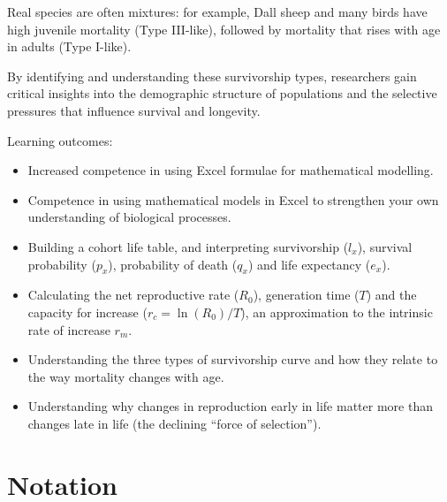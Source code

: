 \documentclass[
  a4paper]{book}
\providecommand{\tightlist}{%
  \setlength{\itemsep}{0pt}\setlength{\parskip}{0pt}}
\begin{document}
Real species are often mixtures: for example, Dall sheep and many birds have high juvenile mortality (Type III-like), followed by mortality that rises with age in adults (Type I-like).

By identifying and understanding these survivorship types, researchers gain critical insights into the demographic structure of populations and the selective pressures that influence survival and longevity.

Learning outcomes:

\begin{itemize}
\tightlist
\item
  Increased competence in using Excel formulae for mathematical modelling.
\item
  Competence in using mathematical models in Excel to strengthen your own understanding of biological processes.
\item
  Building a cohort life table, and interpreting survivorship (\(l_x\)), survival probability (\(p_x\)), probability of death (\(q_x\)) and life expectancy (\(e_x\)).
\item
  Calculating the net reproductive rate (\(R_0\)), generation time (\(T\)) and the capacity for increase (\(r_c = \ln(R_0)/T\)), an approximation to the intrinsic rate of increase \(r_m\).
\item
  Understanding the three types of survivorship curve and how they relate to the way mortality changes with age.
\item
  Understanding why changes in reproduction early in life matter more than changes late in life (the declining ``force of selection'').
\end{itemize}

\section{Notation}\label{notation}
\end{document}
